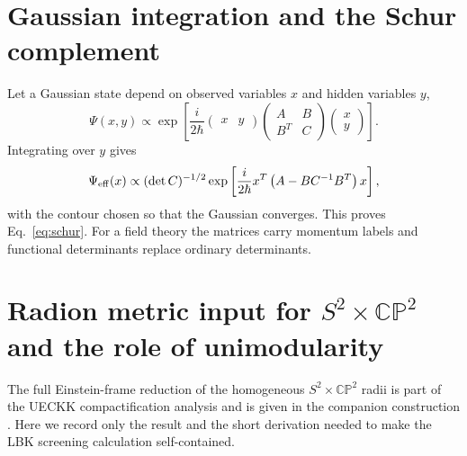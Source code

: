 \documentclass[aps,prd,twocolumn,superscriptaddress,nofootinbib,longbibliography,floatfix]{revtex4-2}
\newcommand{\CP}{\mathbb{CP}}
\begin{document}
\section{Gaussian integration and the Schur complement}
Let a Gaussian state depend on observed variables $x$ and hidden variables $y$,
\begin{equation}
\Psi(x,y)\propto\exp\left[\frac{i}{2\hbar}
\begin{pmatrix}x&y\end{pmatrix}
\begin{pmatrix}A&B\\B^T&C\end{pmatrix}
\begin{pmatrix}x\\y\end{pmatrix}\right].
\end{equation}
Integrating over $y$ gives
\begin{equation}
\Psi_{\rm eff}(x)\propto
(\det C)^{-1/2}\exp\left[\frac{i}{2\hbar}x^T
\left(A-BC^{-1}B^T\right)x\right],
\end{equation}
with the contour chosen so that the Gaussian converges. This proves Eq.~\eqref{eq:schur}. For a field theory the matrices carry momentum labels and functional determinants replace ordinary determinants.




\section{Radion metric input for $S^2\times\CP^2$ and the role of unimodularity}
\label{app:unimodularG}
The full Einstein-frame reduction of the homogeneous $S^2\times\CP^2$ radii is part of the UECKK compactification analysis and is given in the companion construction \cite{ShayaUECKK2026}. Here we record only the result and the short derivation needed to make the LBK screening calculation self-contained.
\end{document}
